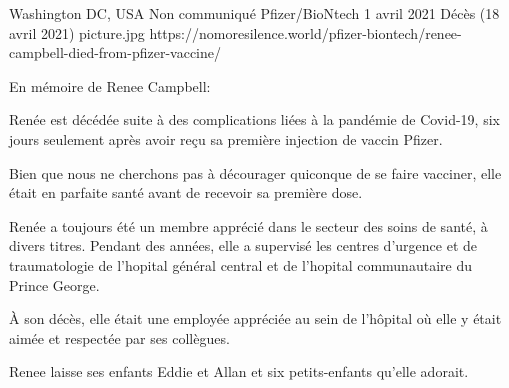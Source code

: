 {Washington DC, USA}
{Non communiqué}
{Pfizer/BioNtech}
{1 avril 2021}
{Décès (18 avril 2021)}
{picture.jpg}
{https://nomoresilence.world/pfizer-biontech/renee-campbell-died-from-pfizer-vaccine/}
{

En mémoire de Renee Campbell:

Renée est décédée suite à des complications liées à la pandémie de Covid-19, six
jours seulement après avoir reçu sa première injection de vaccin Pfizer.

Bien que nous ne cherchons pas à décourager quiconque de se faire vacciner, elle
était en parfaite santé avant de recevoir sa première dose.

Renée a toujours été un membre apprécié dans le secteur des soins de santé, à
divers titres. Pendant des années, elle a supervisé les centres d'urgence et de
traumatologie de l'hopital général central et de l'hopital communautaire du
Prince George.

À son décès, elle était une employée appréciée au sein de l'hôpital où elle y
était aimée et respectée par ses collègues.

Renee laisse ses enfants Eddie et Allan et six petits-enfants qu'elle adorait.

}
